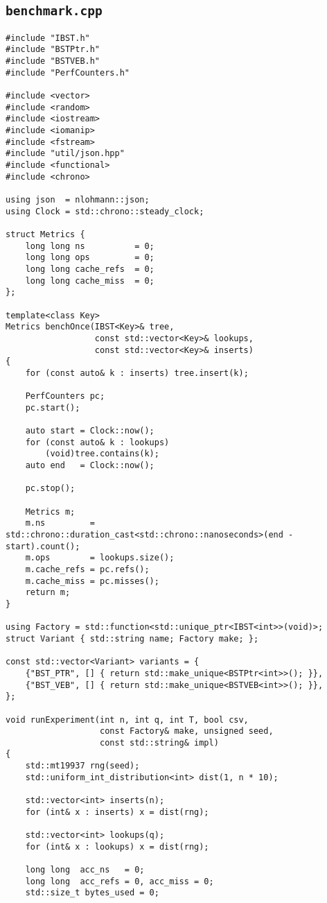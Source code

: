 \subsection{\texttt{benchmark.cpp}}
\label{secsec:bcpp}
\begin{lstlisting}
#include "IBST.h"
#include "BSTPtr.h"
#include "BSTVEB.h"
#include "PerfCounters.h"

#include <vector>
#include <random>
#include <iostream>
#include <iomanip>
#include <fstream>
#include "util/json.hpp"
#include <functional>
#include <chrono>

using json  = nlohmann::json;
using Clock = std::chrono::steady_clock;

struct Metrics {
    long long ns          = 0;
    long long ops         = 0;
    long long cache_refs  = 0;
    long long cache_miss  = 0;
};

template<class Key>
Metrics benchOnce(IBST<Key>& tree,
                  const std::vector<Key>& lookups,
                  const std::vector<Key>& inserts)
{
    for (const auto& k : inserts) tree.insert(k);

    PerfCounters pc;
    pc.start();

    auto start = Clock::now();
    for (const auto& k : lookups)
        (void)tree.contains(k);
    auto end   = Clock::now();

    pc.stop();

    Metrics m;
    m.ns         = std::chrono::duration_cast<std::chrono::nanoseconds>(end - start).count();
    m.ops        = lookups.size();
    m.cache_refs = pc.refs();
    m.cache_miss = pc.misses();
    return m;
}

using Factory = std::function<std::unique_ptr<IBST<int>>(void)>;
struct Variant { std::string name; Factory make; };

const std::vector<Variant> variants = {
    {"BST_PTR", [] { return std::make_unique<BSTPtr<int>>(); }},
    {"BST_VEB", [] { return std::make_unique<BSTVEB<int>>(); }},
};

void runExperiment(int n, int q, int T, bool csv,
                   const Factory& make, unsigned seed,
                   const std::string& impl)
{
    std::mt19937 rng(seed);
    std::uniform_int_distribution<int> dist(1, n * 10);

    std::vector<int> inserts(n);
    for (int& x : inserts) x = dist(rng);

    std::vector<int> lookups(q);
    for (int& x : lookups) x = dist(rng);

    long long  acc_ns   = 0;
    long long  acc_refs = 0, acc_miss = 0;
    std::size_t bytes_used = 0;


\end{lstlisting}
